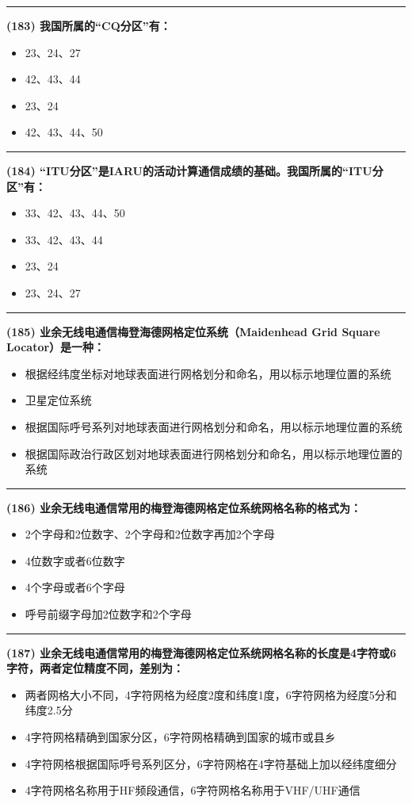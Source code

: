 \documentclass[twocolumn]{ctexart}  %
\begin{document}
\noindent\rule{0.5\textwidth}{1pt}
\heiti \textbf{(183) 我国所属的“CQ分区”有：} \songti {\color{gray} [LK0202] }
\begin{itemize}
	\item  23、24、27
	\item  42、43、44
	\item  23、24
	\item  42、43、44、50
\end{itemize}


\noindent\rule{0.5\textwidth}{1pt}
\heiti \textbf{(184) “ITU分区”是IARU的活动计算通信成绩的基础。我国所属的“ITU分区”有：} \songti {\color{gray} [LK0204] }
\begin{itemize}
	\item  33、42、43、44、50
	\item  33、42、43、44
	\item  23、24
	\item  23、24、27
\end{itemize}


\noindent\rule{0.5\textwidth}{1pt}
\heiti \textbf{(185) 业余无线电通信梅登海德网格定位系统（Maidenhead Grid Square Locator）是一种：} \songti {\color{gray} [LK0862] }
\begin{itemize}
	\item  根据经纬度坐标对地球表面进行网格划分和命名，用以标示地理位置的系统
	\item  卫星定位系统
	\item  根据国际呼号系列对地球表面进行网格划分和命名，用以标示地理位置的系统
	\item  根据国际政治行政区划对地球表面进行网格划分和命名，用以标示地理位置的系统
\end{itemize}


\noindent\rule{0.5\textwidth}{1pt}
\heiti \textbf{(186) 业余无线电通信常用的梅登海德网格定位系统网格名称的格式为：} \songti {\color{gray} [LK0863] }
\begin{itemize}
	\item  2个字母和2位数字、2个字母和2位数字再加2个字母
	\item  4位数字或者6位数字
	\item  4个字母或者6个字母
	\item  呼号前缀字母加2位数字和2个字母
\end{itemize}


\noindent\rule{0.5\textwidth}{1pt}
\heiti \textbf{(187) 业余无线电通信常用的梅登海德网格定位系统网格名称的长度是4字符或6字符，两者定位精度不同，差别为：} \songti {\color{gray} [LK0864] }
\begin{itemize}
	\item  两者网格大小不同，4字符网格为经度2度和纬度1度，6字符网格为经度5分和纬度2.5分
	\item  4字符网格精确到国家分区，6字符网格精确到国家的城市或县乡
	\item  4字符网格根据国际呼号系列区分，6字符网格在4字符基础上加以经纬度细分
	\item  4字符网格名称用于HF频段通信，6字符网格名称用于VHF/UHF通信
\end{itemize}
\end{document}
